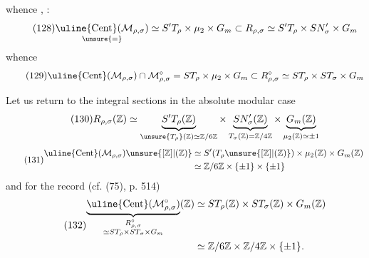 

whence , :
\[
\tag{128}
\underset{\unsure{=}}{\uline{\mathrm{Cent}}(\mathcal M_{\rho,\sigma})}
\simeq S'T_\rho\times\mu_2\times G_m
\subset R_{\rho,\sigma}\simeq S'T_\rho\times SN'_\sigma\times G_m
\]
whence
\[
\tag{129}
\uline{\mathrm{Cent}}(\mathcal M_{\rho,\sigma})\cap\mathcal M_{\rho,\sigma}^{\circ}
=ST_\rho\times\mu_2\times G_m
\subset R_{\rho,\sigma}^{\circ}\simeq ST_\rho\times ST_\sigma\times G_m
\]

Let us return to the integral sections in the absolute modular case
\[
\tag{130}
R_{\rho,\sigma}(\mathbb Z)\simeq
\underbrace{S'T_\rho(\mathbb Z)}_{\unsure{T_\rho}(\mathbb Z)\simeq\mathbb Z/6\mathbb Z}
\times
\underbrace{SN'_\sigma(\mathbb Z)}_{T_\sigma(\mathbb Z)=\mathbb Z/4\mathbb Z}
\times
\underbrace{G_m(\mathbb Z)}_{\mu_2(\mathbb Z)\simeq\pm1}
\]
\[
\tag{131}
\begin{aligned}
\uline{\mathrm{Cent}}(\mathcal M_{\rho,\sigma})\unsure{[\mathbb Z]|(\mathbb Z)}
&\simeq S'(T_\rho\unsure{[\mathbb Z]|(\mathbb Z)})\times\mu_2(\mathbb Z)\times G_m(\mathbb Z)\\
&\simeq\mathbb Z/6\mathbb Z\times\{\pm1\}\times\{\pm1\}
\end{aligned}
\]
and for the record (cf. (75), p. 514)
\[
\tag{132}
\begin{aligned}
\underbrace{\uline{\mathrm{Cent}}(\mathcal M_{\rho,\sigma}^{\circ})}_{\substack{R_{\rho,\sigma}^{\circ}\\\simeq ST_\rho\times ST_\sigma\times G_m}}(\mathbb Z)
&\simeq ST_\rho(\mathbb Z)\times ST_\sigma(\mathbb Z)\times G_m(\mathbb Z)\\
&\simeq\mathbb Z/6\mathbb Z\times\mathbb Z/4\mathbb Z\times\{\pm1\}.
\end{aligned}
\]

